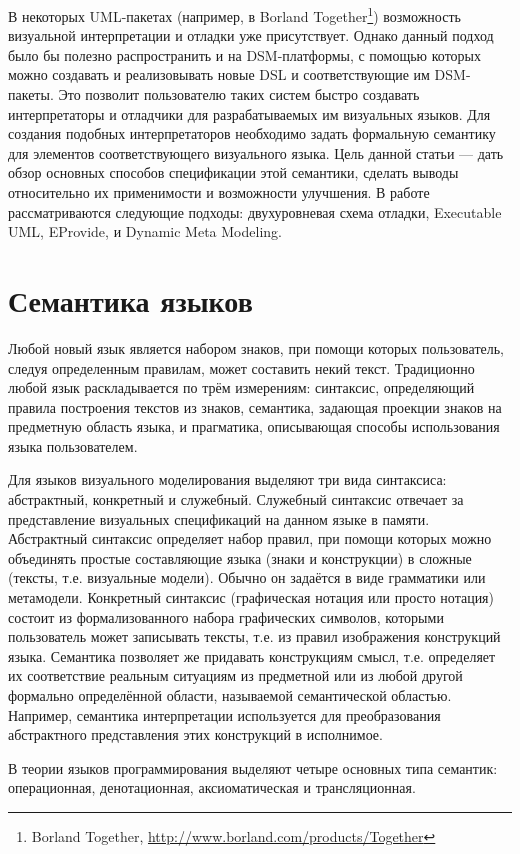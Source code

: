 \documentclass[a5paper]{article}
\begin{document}
В некоторых UML-пакетах (например, в Borland Together\footnote{Borland Together, \url{http://www.borland.com/products/Together}}) возможность визуальной интерпретации и отладки уже присутствует. Однако данный подход было бы полезно распространить и на DSM-платформы, с помощью которых можно создавать и реализовывать новые DSL и соответствующие им DSM-пакеты. Это позволит пользователю таких систем быстро создавать интерпретаторы и отладчики для разрабатываемых им визуальных языков. Для создания подобных интерпретаторов необходимо задать формальную семантику для элементов соответствующего визуального языка. Цель данной статьи — дать обзор основных способов спецификации этой семантики, сделать выводы относительно их применимости и возможности улучшения. В работе рассматриваются следующие подходы: двухуровневая схема отладки, Executable UML, EProvide, и Dynamic Meta Modeling. 

\section{Семантика языков}

Любой новый язык является набором знаков, при помощи которых пользователь, следуя определенным правилам, может составить некий текст. Традиционно любой язык раскладывается по трём измерениям: синтаксис, определяющий правила построения текстов из знаков, семантика, задающая проекции знаков на предметную область языка, и прагматика, описывающая способы использования языка пользователем.

Для языков визуального моделирования выделяют три вида синтаксиса: абстрактный, конкретный и служебный. Служебный синтаксис отвечает за представление визуальных спецификаций на данном языке в памяти. Абстрактный синтаксис определяет набор правил, при помощи которых можно объединять простые составляющие языка (знаки и конструкции) в сложные (тексты, т.е. визуальные модели). Обычно он задаётся в виде грамматики или метамодели. Конкретный синтаксис (графическая нотация или просто нотация) состоит из формализованного набора графических символов, которыми пользователь может записывать тексты, т.е. из правил изображения конструкций языка. Семантика позволяет же придавать конструкциям смысл, т.е. определяет их соответствие реальным ситуациям из предметной или из любой другой формально определённой области, называемой семантической областью. Например, семантика интерпретации используется для преобразования абстрактного представления этих конструкций в исполнимое.

В теории языков программирования выделяют четыре основных типа семантик: операционная, денотационная, аксиоматическая и трансляционная.
\end{document}
